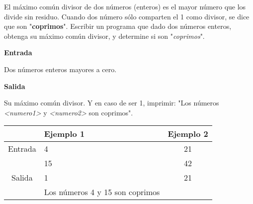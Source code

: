 
\question El máximo común divisor de dos números (enteros) es el mayor
          número que los divide sin residuo. Cuando dos número sólo
          comparten el 1 como divisor, se dice que son "\textbf{coprimos}".
          Escribir un programa que dado dos números enteros, obtenga su
          máximo común divisor, y determine si son "\emph{coprimos}".

\textbf{Entrada}

Dos números enteros mayores a cero.

\textbf{Salida}

Su máximo común divisor. Y en caso de ser 1, imprimir: "Los números
\emph{<numero1>} y \emph{<numero2>} son coprimos".

\begin{center}
  \begin{tabular}{|c|l|c|}
     \hline
     \rowcolor[HTML]{C0C0C0}
             & Ejemplo 1 & Ejemplo 2 \\
     \hline
     Entrada & 4         &  21 \\
             & 15        &  42 \\
     \hline
     Salida  & 1 & 21 \\
             & Los números 4 y 15 son coprimos & \\
     \hline
  \end{tabular}
\end{center}


